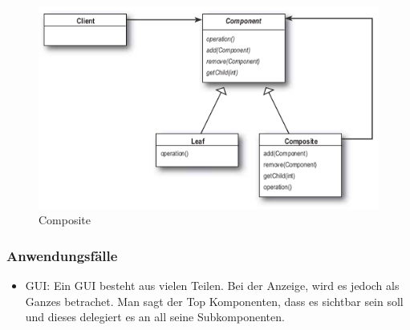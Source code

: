 \begin{figure}[h]
	\centering
	\includegraphics[width=0.6\linewidth]{images/composite_pattern}
	\caption{Composite}
	\label{fig:compositepattern}
\end{figure}

\subsubsection{Anwendungsfälle} 
\begin{itemize}
	\item GUI: Ein GUI besteht aus vielen Teilen. Bei der Anzeige, wird es jedoch als Ganzes betrachet. Man sagt der Top Komponenten, dass es sichtbar sein soll und dieses delegiert es an all seine Subkomponenten.
\end{itemize}



